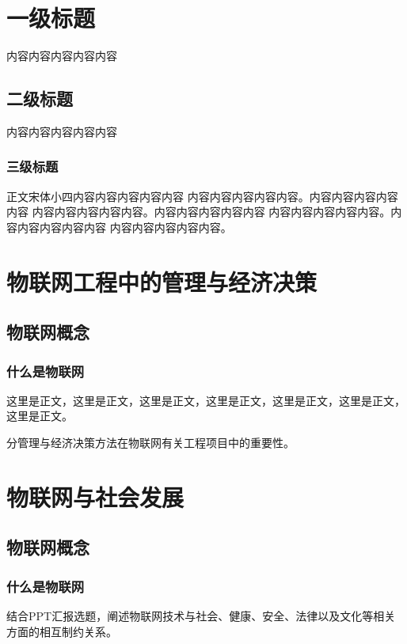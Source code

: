 \documentclass{hhutemplate}
\begin{document}
    \makeCover

    \makeAbstract

    \tableofcontents

    \newpage

    \begin{spacing}{1.5}  %

    \section{一级标题}
    内容内容内容内容内容
    \subsection{二级标题}
    内容内容内容内容内容
    \subsubsection{三级标题}

    正文宋体小四内容内容内容内容内容 内容内容内容内容内容。内容内容内容内容内容 内容内容内容内容内容。内容内容内容内容内容 内容内容内容内容内容。内容内容内容内容内容 内容内容内容内容内容。

    \section{物联网工程中的管理与经济决策}

    \subsection{物联网概念}

    \subsubsection{什么是物联网}
    这里是正文，这里是正文，这里是正文，这里是正文，这里是正文，这里是正文，这里是正文。

    分管理与经济决策方法在物联网有关工程项目中的重要性。
    
    \section{物联网与社会发展}

    \subsection{物联网概念}

    \subsubsection{什么是物联网}
    结合PPT汇报选题，阐述物联网技术与社会、健康、安全、法律以及文化等相关方面的相互制约关系。
    

\end{spacing}
\end{document}
